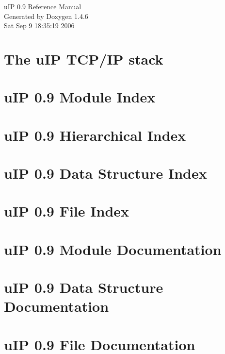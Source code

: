 \documentclass[a4paper]{book}
\begin{document}
\begin{titlepage}
\vspace*{7cm}
\begin{center}
{\Large u\-IP 0.9 Reference Manual}\\
\vspace*{1cm}
{\large Generated by Doxygen 1.4.6}\\
\vspace*{0.5cm}
{\small Sat Sep 9 18:35:19 2006}\\
\end{center}
\end{titlepage}
\clearemptydoublepage
{}
\tableofcontents
\clearemptydoublepage
{}
\chapter{The u\-IP TCP/IP stack }
\label{index}\hypertarget{index}{}
\chapter{u\-IP 0.9 Module Index}

\chapter{u\-IP 0.9 Hierarchical Index}

\chapter{u\-IP 0.9 Data Structure Index}

\chapter{u\-IP 0.9 File Index}

\chapter{u\-IP 0.9 Module Documentation}

























\chapter{u\-IP 0.9 Data Structure Documentation}







\chapter{u\-IP 0.9 File Documentation}

























\printindex
\end{document}
